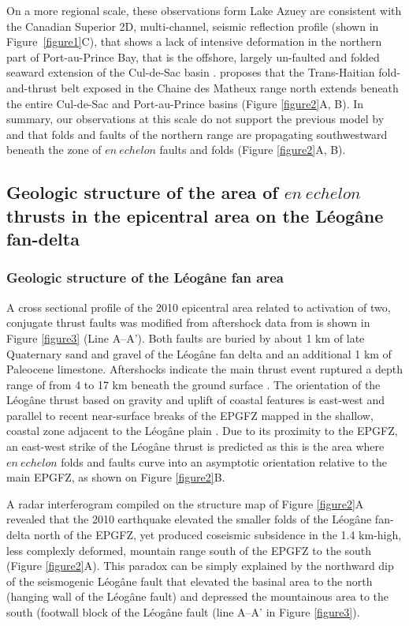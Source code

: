 \documentclass[linenumbers,draft]{agujournal}
\begin{document}
On a more regional scale, these observations form Lake Azuey are consistent with the Canadian Superior 2D, multi-channel, seismic reflection profile (shown in Figure~\ref{figure1}C), that shows a lack of intensive deformation in the northern part of Port-au-Prince Bay, that is the offshore, largely un-faulted and folded seaward extension of the Cul-de-Sac basin \citep{mchugh2011offshore}. \citet{pubellier2000plate} proposes that the Trans-Haitian fold-and-thrust belt exposed in the Chaine des Matheux range north extends beneath the entire Cul-de-Sac and Port-au-Prince basins (Figure \ref{figure2}A, B). In summary, our observations at this scale do not support the previous model by \citet{pubellier2000plate} and \citet{calais2010transpressional} that folds and faults of the northern range are propagating southwestward beneath the zone of $en~echelon$ faults and folds (Figure \ref{figure2}A, B).

\subsection{Geologic structure of the area of $en~echelon$ thrusts in the epicentral area on the L\'eog\^ane fan-delta}
\subsubsection{Geologic structure of the L\'eog\^ane fan area}
A cross sectional profile of the 2010 epicentral area related to activation of two, conjugate thrust faults was modified from aftershock data from \citet{douilly2013crustal,douilly2015three} is shown in Figure \ref{figure3} (Line A--A'). Both faults are buried by about 1 km of late Quaternary sand and gravel of the L\'eog\^ane fan delta \citep{kocel2016near} and an additional 1 km of Paleocene limestone. Aftershocks indicate the main thrust event ruptured a depth range of from 4 to 17 km beneath the ground surface \citep{douilly2013crustal,douilly2015three}. The orientation of the L\'eog\^ane thrust based on gravity and uplift of coastal features is east-west and parallel to recent near-surface breaks of the EPGFZ mapped in the shallow, coastal zone adjacent to the L\'eog\^ane plain \citep{hornbach2010high}. Due to its proximity to the EPGFZ, an east-west strike of the L\'eog\^ane thrust is predicted as this is the area where $en~echelon$ folds and faults curve into an asymptotic orientation relative to the main EPGFZ, as shown on Figure \ref{figure2}B.

A radar interferogram compiled on the structure map of Figure \ref{figure2}A revealed that the 2010 earthquake elevated the smaller folds of the L\'eog\^ane fan-delta north of the EPGFZ, yet produced coseismic subsidence in the 1.4 km-high, less complexly deformed, mountain range south of the EPGFZ to the south \citep{hashimoto2011fan} (Figure \ref{figure2}A). This paradox can be simply explained by the northward dip of the seismogenic L\'eog\^ane fault that elevated the basinal area to the north (hanging wall of the L\'eog\^ane fault) and depressed the mountainous area to the south (footwall block of the L\'eog\^ane fault (line A--A' in Figure \ref{figure3}). 
\end{document}
